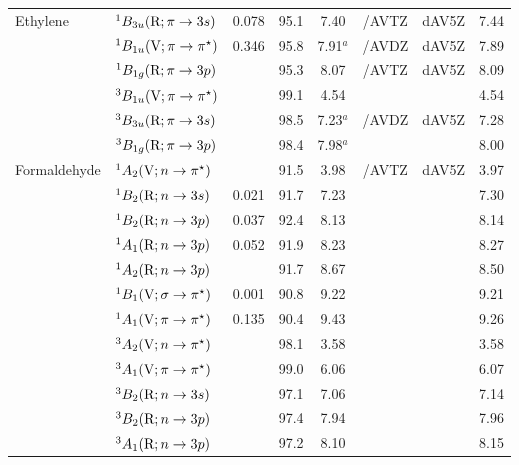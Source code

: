 \begin{tabular}{llcccccc}
      Ethylene		&$^1B_{3u} (\mathrm{R};\pi \rightarrow 3s)$ 					& 0.078	&95.1 &7.40		&{\exCI}/AVTZ & dAV5Z		&7.44	 \\
                        &$^1B_{1u} (\mathrm{V};\pi \rightarrow \pi^\star)$ 				& 0.346	&95.8 &7.91$^a$	&{\exCI}/AVDZ& dAV5Z		&7.89	\\
                        &$^1B_{1g} (\mathrm{R};\pi \rightarrow 3p)$ 					&		&95.3 &8.07		& {\exCI}/AVTZ& dAV5Z		&8.09	\\
                        &$^3B_{1u} (\mathrm{V};\pi \rightarrow \pi^\star)$ 				&		&99.1 &4.54		& 			&			&4.54	\\
                        &$^3B_{3u} (\mathrm{R};\pi \rightarrow 3s)$ 					&		&98.5 &7.23$^a$	&{\exCI}/AVDZ& dAV5Z		&7.28	\\
                        &$^3B_{1g} (\mathrm{R};\pi \rightarrow 3p)$ 					&		&98.4 &7.98$^a$	&			&			&8.00	\\
      Formaldehyde	&$^1A_2 (\mathrm{V}; n \rightarrow \pi^\star)$ 				&		&91.5 &3.98		&{\exCI}/AVTZ & dAV5Z		&3.97	\\
                        &$^1B_2 (\mathrm{R};n \rightarrow 3s)$ 						& 0.021	&91.7 &7.23		&			 &			&7.30	\\
                        &$^1B_2 (\mathrm{R};n \rightarrow 3p)$ 						& 0.037	&92.4 &8.13		&			&			&8.14	\\
                        &$^1A_1 (\mathrm{R};n \rightarrow 3p)$ 						& 0.052	&91.9 &8.23		&			&			&8.27	\\
                        &$^1A_2 (\mathrm{R};n \rightarrow 3p)$ 						&		&91.7 &8.67		&			&			&8.50	\\
                        &$^1B_1 (\mathrm{V};\sigma \rightarrow \pi^\star)$				& 0.001	&90.8 &9.22		&			&			&9.21	\\
                        &$^1A_1 (\mathrm{V};\pi \rightarrow \pi^\star)$				& 0.135	&90.4 &9.43		&			&			&9.26	\\
                        &$^3A_2 (\mathrm{V};n \rightarrow \pi^\star)$ 					&		&98.1 &3.58		&			&			&3.58	\\
                        &$^3A_1 (\mathrm{V};\pi \rightarrow \pi^\star)$				&		&99.0 &6.06		&			&			&6.07	\\
                        &$^3B_2 (\mathrm{R};n \rightarrow 3s)$ 						&		&97.1 &7.06		&			&			&7.14	\\
                        &$^3B_2 (\mathrm{R};n \rightarrow 3p)$ 						&		&97.4 &7.94		&			&			&7.96	\\
                        &$^3A_1 (\mathrm{R};n \rightarrow 3p)$ 						&		&97.2 &8.10		&			&			&8.15	\\

\end{tabular}
